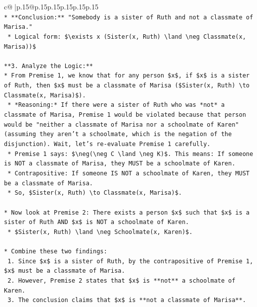 \documentclass{article}
\begin{document}
{\begin{supertabular}{c@{$\;$}|p{.15\linewidth}@{}p{.15\linewidth}p{.15\linewidth}p{.15\linewidth}p{.15\linewidth}p{.15\linewidth}}
{{{\\ 
\texttt{*   **Conclusion:** "Somebody is a sister of Ruth and not a classmate of Marisa."} \\
\texttt{    *   Logical form: \$\textbackslash{}exists x (Sister(x, Ruth) \textbackslash{}land \textbackslash{}neg Classmate(x, Marisa))\$} \\
\\ 
\texttt{**3. Analyze the Logic:**} \\
\texttt{*   From Premise 1, we know that for any person \$x\$, if \$x\$ is a sister of Ruth, then \$x\$ must be a classmate of Marisa (\$Sister(x, Ruth) \textbackslash{}to Classmate(x, Marisa)\$).} \\
\texttt{    *   *Reasoning:* If there were a sister of Ruth who was *not* a classmate of Marisa, Premise 1 would be violated because that person would be "neither a classmate of Marisa nor a schoolmate of Karen" (assuming they aren't a schoolmate, which is the negation of the disjunction). Wait, let's re{-}evaluate Premise 1 carefully.} \\
\texttt{    *   Premise 1 says: \$\textbackslash{}neg(\textbackslash{}neg C \textbackslash{}land \textbackslash{}neg K)\$. This means: If someone is NOT a classmate of Marisa, they MUST be a schoolmate of Karen.} \\
\texttt{    *   Contrapositive: If someone IS NOT a schoolmate of Karen, they MUST be a classmate of Marisa.} \\
\texttt{    *   So, \$Sister(x, Ruth) \textbackslash{}to Classmate(x, Marisa)\$.} \\
\\ 
\texttt{*   Now look at Premise 2: There exists a person \$x\$ such that \$x\$ is a sister of Ruth AND \$x\$ is NOT a schoolmate of Karen.} \\
\texttt{    *   \$Sister(x, Ruth) \textbackslash{}land \textbackslash{}neg Schoolmate(x, Karen)\$.} \\
\\ 
\texttt{*   Combine these two findings:} \\
\texttt{    1.  Since \$x\$ is a sister of Ruth, by the contrapositive of Premise 1, \$x\$ must be a classmate of Marisa.} \\
\texttt{    2.  However, Premise 2 states that \$x\$ is **not** a schoolmate of Karen.} \\
\texttt{    3.  The conclusion claims that \$x\$ is **not a classmate of Marisa**.} \\
\\ 
}}}
\end{supertabular}}
\end{document}
